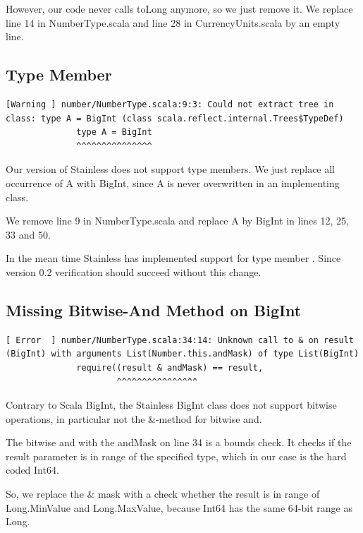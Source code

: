 \documentclass[runningheads]{llncs}
\begin{document}
However, our code never calls toLong anymore, so we just remove it. We
replace line 14 in NumberType.scala and line 28 in CurrencyUnits.scala
by an empty line.


\subsection{Type Member}

\begin{lstlisting}[style=stainless]
[Warning ] number/NumberType.scala:9:3: Could not extract tree in class: type A = BigInt (class scala.reflect.internal.Trees$TypeDef)
              type A = BigInt
              ^^^^^^^^^^^^^^^
\end{lstlisting}

Our version of Stainless does not support type members. We just
replace all occurrence of A with BigInt, since A is never overwritten
in an implementing class.

We remove line 9 in NumberType.scala and replace A by BigInt in lines
12, 25, 33 and 50.

In the mean time Stainless has implemented support for type member
\cite{Stainless:pull470}.  Since version 0.2 verification should
succeed without this change.



\subsection{Missing Bitwise-And Method on BigInt}

\begin{lstlisting}[style=stainless]
[ Error  ] number/NumberType.scala:34:14: Unknown call to & on result (BigInt) with arguments List(Number.this.andMask) of type List(BigInt)
              require((result & andMask) == result,
                      ^^^^^^^^^^^^^^^^
\end{lstlisting}

Contrary to Scala BigInt, the Stainless BigInt class does not support
bitwise operations, in particular not the \&-method for bitwise and.

The bitwise and with the andMask on line 34 is a bounds check.  It
checks if the result parameter is in range of the specified type,
which in our case is the hard coded Int64.

So, we replace the \& mask with a check whether the result
is in range of Long.MinValue and Long.MaxValue, because Int64 has the
same 64-bit range as Long.  
\end{document}
